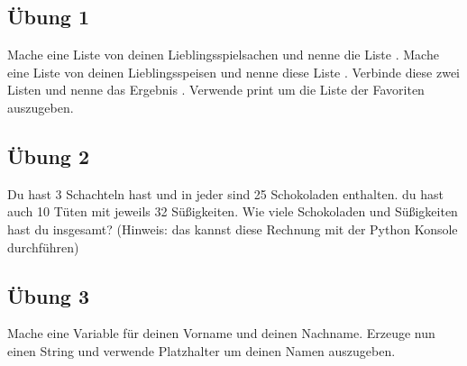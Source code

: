 \subsection*{Übung 1}
Mache eine Liste von deinen Lieblingsspielsachen und nenne die Liste . Mache eine Liste von deinen Lieblingsspeisen und nenne diese Liste . Verbinde diese zwei Listen und nenne das Ergebnis . Verwende print um die Liste der Favoriten auszugeben.

\subsection*{Übung 2}
Du hast 3 Schachteln hast und in jeder sind 25 Schokoladen enthalten. du hast auch 10 Tüten mit jeweils 32 Süßigkeiten. Wie viele Schokoladen und Süßigkeiten hast du insgesamt? (Hinweis: das kannst diese Rechnung mit der Python Konsole durchführen)

\subsection*{Übung 3}
Mache eine Variable für deinen Vorname und deinen Nachname. Erzeuge nun einen String und verwende Platzhalter um deinen Namen auszugeben.

\newpage
